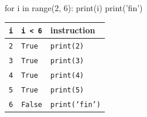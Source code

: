 	\begin{minipage}{0.45\linewidth}
		
	\begin{exemple}{}
			\begin{CodePythontexAlt}[TaillePolice=\normalsize, Largeur=1\linewidth,Centre,PremLigne=1, Lignes=false,]{}
		for i in range(2, 6):
			print(i)
		print('fin')
	\end{CodePythontexAlt}
	
		\end{exemple}

	\end{minipage}\hfill{}
	\begin{minipage}{0.55\linewidth}
	
	\renewcommand{\arraystretch}{1.1}
	\begin{center}
	\begin{tabular}{|c|p{2cm}|p{4cm}|}
		\hline
		\texttt{i}  & \texttt{i < 6} & instruction \\ \hline
		\texttt{2}  & \texttt{True} & \texttt{print(2)} \\ \hline
		\texttt{3}  & \texttt{True} & \texttt{print(3)} \\ \hline
		\texttt{4}  & \texttt{True} & \texttt{print(4)} \\ \hline
		\texttt{5}  & \texttt{True} & \texttt{print(5)} \\ \hline
		\texttt{6}  & \texttt{False} & \texttt{print('fin')} \\ \hline
	\end{tabular}	
	\end{center}
	
	\end{minipage}
	
